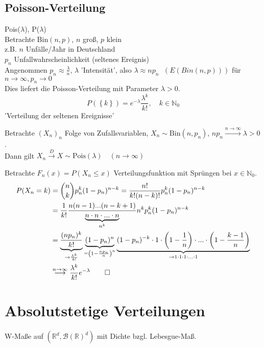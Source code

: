 \documentclass[a4paper,openany]{book}
\theoremstyle{mytheoremstyle}
\theoremstyle{mytheoremstyle2}
\newtheorem*{cbew}{Beweis}
\newenvironment{bew}[1][]{%
  \ifthenelse{\boolean{showbew}}{%
    \begin{cbew}[#1]%
  }{%
    \expandafter\comment%
  }%
}{%
  \ifthenelse{\boolean{showbew}}{%
    \end{cbew}%
  }{%
    \expandafter\endcomment%
  }%
}
\begin{document}
\subsection{Poisson-Verteilung} Pois($\lambda $), P($\lambda $)\\
Betrachte Bin$(n,p)$, $n$ groß, $p$ klein \\
z.B. $n$ Unfälle/Jahr in Deutschland \\
$p_n$ Unfallwahrscheinlichkeit (seltenes Ereignis) \\
Angenommen $p_n\approx \frac{\lambda }{n}$, $\lambda $ 'Intensität', also $\lambda \approx np_n$ $\;(E(Bin(n,p)))$ für 
$n \to \infty, p_n \to 0$ \\
Dies liefert die Poisson-Verteilung mit Parameter $\lambda >0$.
\[
  P(\left\{k\right\})=e^{-\lambda }\frac{\lambda ^k}{k!}, \quad k \in \mathbb{N}_0
\]
'Verteilung der seltenen Ereignisse'
\begin{theo}{1.1}{}
  Betrachte $(X_n)_n$ Folge von Zufallsvariablen, $X_n \sim \text{Bin}(n,p_n)$, $np_n \overset{n\to\infty}\to \lambda >0$.\\
  Dann gilt $X_n \overset{D}\to X\sim \text{Pois}(\lambda ) \quad(n\to\infty)$   
\end{theo}
\begin{bew}[]
  Betrachte $F_n(x)=P(X_n \leq x)$ Verteilungsfunktion mit Sprüngen bei $x \in \mathbb{N}_0$.
  \begin{align*}
    P(X_n=k)&=\binom{n}{k}p_n^k(1-p_n)^{n-k}=\frac{n!}{k!(n-k)!}p_n^k(1-p_n)^{n-k}\\
            &=\frac{1}{k!} \frac{n(n-1)...(n-k+1)}{\underbrace{n \cdot n \cdot ...\cdot n}_{n^k \text{}}}n^kp_n^k(1-p_n)^{n-k}\\
            &=\underbrace{\frac{(np_n)^k}{k!}}_{\to\frac{\lambda ^k}{k!} \text{}}\underbrace{(1-p_n)^n}_{=\left(1-\frac{np_n}{n}\right)^n }\underbrace{(1-p_n)^{-k}\cdot 1 \cdot \left(1-\frac{1}{n}\right)\cdot ... \cdot \left(1-\frac{k-1}{n}\right)}_{\to1 \cdot 1 \cdot 1 \cdot ... \cdot 1 \text{}}\\
            &\overset{n\to\infty\text{}}\longrightarrow \frac{\lambda ^k}{k!}e^{-\lambda }\qed
  \end{align*}
\end{bew}
\section{Absolutstetige Verteilungen}
W-Maße auf $(\mathbb{R}^d,\mathcal{B}(\mathbb{R})^d)$ mit Dichte bzgl. Lebesgue-Maß. \\
\end{document}
